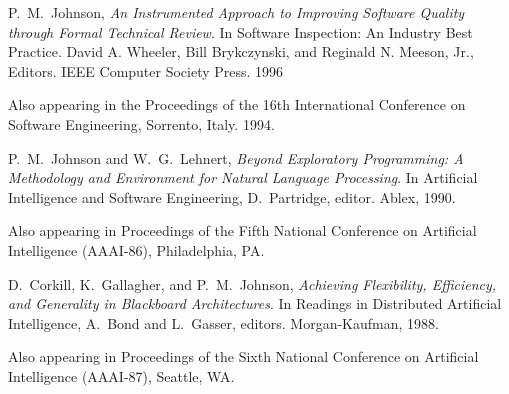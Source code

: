 \begin{Book Chapters}

\item P.~M.~Johnson, {\em An Instrumented Approach to Improving Software
  Quality through Formal Technical Review}. In Software Inspection: 
  An Industry Best Practice.  David A. Wheeler, Bill Brykczynski, and
  Reginald N. Meeson, Jr., Editors.  IEEE Computer Society Press. 1996

  Also appearing in the Proceedings of the 16th International Conference on
  Software Engineering, Sorrento,  Italy. 1994.
  
\item P.~M.~Johnson and W.~G.~Lehnert, {\em Beyond Exploratory Programming:
  A Methodology and Environment for Natural Language Processing}. In
  Artificial Intelligence and Software Engineering, D.~Partridge, editor.
  Ablex, 1990. 
  
  Also appearing in Proceedings of the Fifth National Conference on
  Artificial Intelligence (AAAI-86), Philadelphia, PA.

\item D.~Corkill, K.~Gallagher, and P.~M.~Johnson, {\em Achieving
  Flexibility, Efficiency, and Generality in Blackboard Architectures}. In
  Readings in Distributed Artificial Intelligence, A.~Bond and L.~Gasser,
  editors.  Morgan-Kaufman, 1988. 
  
  Also appearing in Proceedings of the Sixth National Conference on
  Artificial Intelligence (AAAI-87), Seattle, WA.
  

\end{Book Chapters}


